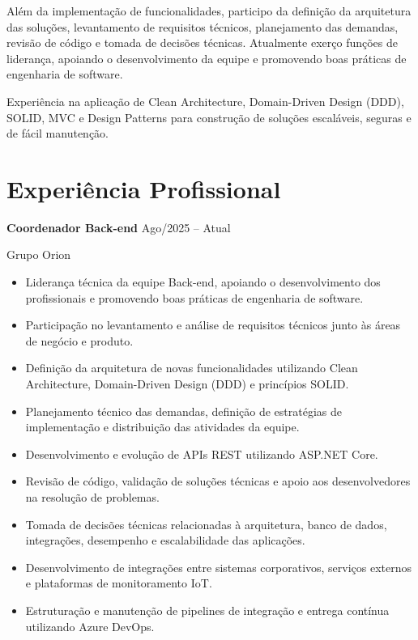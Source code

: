 \documentclass[11pt,a4paper]{article}
\begin{document}
Além da implementação de funcionalidades, participo da definição da arquitetura das soluções, levantamento de requisitos técnicos, planejamento das demandas, revisão de código e tomada de decisões técnicas. Atualmente exerço funções de liderança, apoiando o desenvolvimento da equipe e promovendo boas práticas de engenharia de software.

Experiência na aplicação de Clean Architecture, Domain-Driven Design (DDD), SOLID, MVC e Design Patterns para construção de soluções escaláveis, seguras e de fácil manutenção.

\section{Experiência Profissional}

\textbf{Coordenador Back-end}
\hfill Ago/2025 -- Atual

Grupo Orion

\begin{itemize}[leftmargin=*,noitemsep,topsep=2pt]

\item Liderança técnica da equipe Back-end, apoiando o desenvolvimento dos profissionais e promovendo boas práticas de engenharia de software.

\item Participação no levantamento e análise de requisitos técnicos junto às áreas de negócio e produto.

\item Definição da arquitetura de novas funcionalidades utilizando Clean Architecture, Domain-Driven Design (DDD) e princípios SOLID.

\item Planejamento técnico das demandas, definição de estratégias de implementação e distribuição das atividades da equipe.

\item Desenvolvimento e evolução de APIs REST utilizando ASP.NET Core.

\item Revisão de código, validação de soluções técnicas e apoio aos desenvolvedores na resolução de problemas.

\item Tomada de decisões técnicas relacionadas à arquitetura, banco de dados, integrações, desempenho e escalabilidade das aplicações.

\item Desenvolvimento de integrações entre sistemas corporativos, serviços externos e plataformas de monitoramento IoT.

\item Estruturação e manutenção de pipelines de integração e entrega contínua utilizando Azure DevOps.

\end{itemize}
\end{document}
